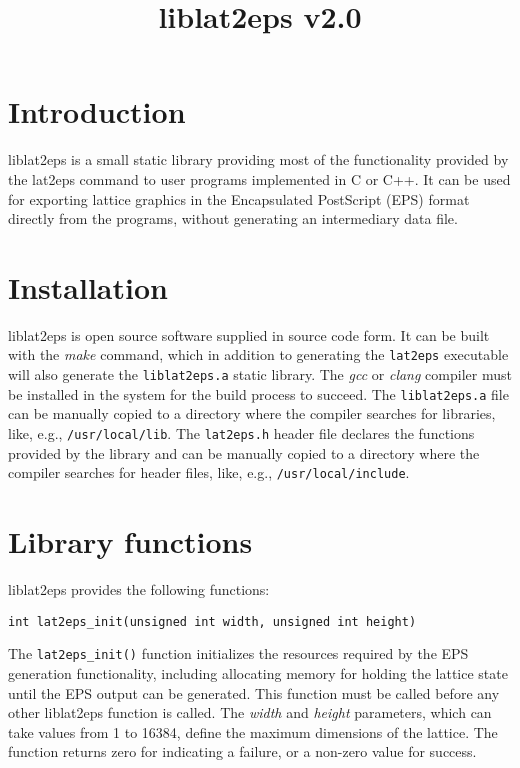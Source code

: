 \documentclass[a4paper]{article}
\title{\vspace{-5ex}liblat2eps v2.0}
\author{}
\date{\vspace{-5ex}}
\begin{document}
\maketitle


\section{Introduction}

liblat2eps is a small static library providing most of the functionality provided by the lat2eps command to user programs implemented in C or C++. It can be used for exporting lattice graphics in the Encapsulated PostScript (EPS) format directly from the programs, without generating an intermediary data file.
\bigbreak

\section{Installation}

liblat2eps is open source software supplied in source code form. It can be built with the \textit{make} command, which in addition to generating the \texttt{lat2eps} executable will also generate the \texttt{liblat2eps.a} static library. The \textit{gcc} or \textit{clang} compiler must be installed in the system for the build process to succeed. The \texttt{liblat2eps.a} file can be manually copied to a directory where the compiler searches for libraries, like, e.g., \texttt{/usr/local/lib}. The \texttt{lat2eps.h} header file declares the functions provided by the library and can be manually copied to a directory where the compiler searches for header files, like, e.g., \texttt{/usr/local/include}.
\bigbreak


\section{Library functions}

liblat2eps provides the following functions:
\bigbreak\bigbreak

\texttt{int lat2eps\_init(unsigned int width, unsigned int height)}
\bigbreak

The \texttt{lat2eps\_init()} function initializes the resources required by the EPS generation functionality, including allocating memory for holding the lattice state until the EPS output can be generated. This function must be called before any other liblat2eps function is called. The \textit{width} and \textit{height} parameters, which can take values from 1 to 16384, define the maximum dimensions of the lattice. The function returns zero for indicating a failure, or a non-zero value for success.
\bigbreak\bigbreak
\end{document}
